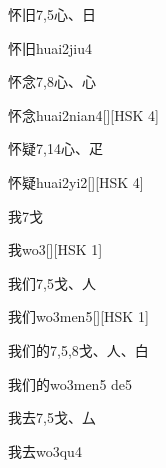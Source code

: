 \begin{entry}{怀旧}{7,5}{⼼、⽇}
  \begin{phonetics}{怀旧}{huai2jiu4}
  \end{phonetics}
\end{entry}

\begin{entry}{怀念}{7,8}{⼼、⼼}
  \begin{phonetics}{怀念}{huai2nian4}[][HSK 4]
  \end{phonetics}
\end{entry}

\begin{entry}{怀疑}{7,14}{⼼、⽦}
  \begin{phonetics}{怀疑}{huai2yi2}[][HSK 4]
  \end{phonetics}
\end{entry}

\begin{entry}{我}{7}{⼽}
  \begin{phonetics}{我}{wo3}[][HSK 1]
  \end{phonetics}
\end{entry}

\begin{entry}{我们}{7,5}{⼽、⼈}
  \begin{phonetics}{我们}{wo3men5}[][HSK 1]
  \end{phonetics}
\end{entry}

\begin{entry}{我们的}{7,5,8}{⼽、⼈、⽩}
  \begin{phonetics}{我们的}{wo3men5 de5}
  \end{phonetics}
\end{entry}

\begin{entry}{我去}{7,5}{⼽、⼛}
  \begin{phonetics}{我去}{wo3qu4}
  \end{phonetics}
\end{entry}

